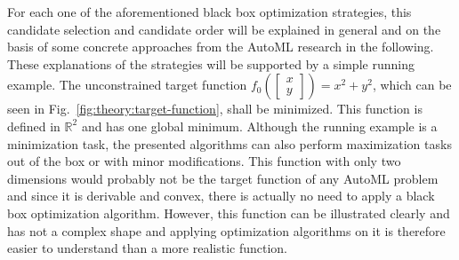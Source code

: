 For each one of the aforementioned black box optimization strategies, this candidate selection and candidate order will be explained in general and on the basis of some concrete approaches from the AutoML research in the following.
These explanations of the strategies will be supported by a simple running example.\newline
The unconstrained target function $f_0 \left( \begin{bmatrix}x\\y \end{bmatrix} \right) = x^2 + y^2$, which can be seen in Fig.~\ref{fig:theory:target-function}, shall be minimized.
This function is defined in $\mathbb{R}^2$ and has one global minimum.
Although the running example is a minimization task, the presented algorithms can also perform maximization tasks out of the box or with minor modifications.\newline
This function with only two dimensions would probably not be the target function of any AutoML problem and since it is derivable and convex, there is actually no need to apply a black box optimization algorithm.
However, this function can be illustrated clearly and has not a complex shape and applying optimization algorithms on it is therefore easier to understand than a more realistic function.

